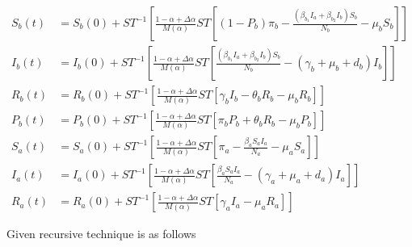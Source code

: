 \documentclass[10pt]{NSP1}
\begin{document}
\begin{equation}
\begin{aligned}
S_{b}(t) &= S_{b}(0) + {ST}^{- 1}\left\lbrack \frac{1 - \alpha + \Delta\alpha}{M(\alpha)}ST\left\lbrack \left( 1 - P_{b} \right)\pi_{b} - \frac{\left( \beta_{b_{1}}I_{a} + \beta_{b_{2}}I_{b} \right)S_{b}}{N_{b}} - \mu_{b}S_{b} \right\rbrack \right\rbrack \\
I_{b}(t) &= I_{b}(0) + {ST}^{- 1}\left\lbrack \frac{1 - \alpha + \Delta\alpha}{M(\alpha)}ST\left\lbrack \frac{\left( \beta_{b_{1}}I_{a} + \beta_{b_{2}}I_{b} \right)S_{b}}{N_{b}} - \left( \gamma_{b} + \mu_{b} + d_{b} \right)I_{b} \right\rbrack \right\rbrack \\
R_{b}(t) &= R_{b}(0) + {ST}^{- 1}\left\lbrack \frac{1 - \alpha + \Delta\alpha}{M(\alpha)}ST\left\lbrack \gamma_{b}I_{b} - \theta_{b}R_{b} - \mu_{b}R_{b} \right\rbrack \right\rbrack \\
P_{b}(t) &= P_{b}(0) + {ST}^{- 1}\left\lbrack \frac{1 - \alpha + \Delta\alpha}{M(\alpha)}ST\left\lbrack \pi_{b}P_{b} + \theta_{b}R_{b} - \mu_{b}P_{b} \right\rbrack \right\rbrack \\
S_{a}(t) &= S_{a}(0) + {ST}^{- 1}\left\lbrack \frac{1 - \alpha + \Delta\alpha}{M(\alpha)}ST\left\lbrack \pi_{a} - \frac{\beta_{a}S_{a}I_{a}}{N_{a}} - \mu_{a}S_{a} \right\rbrack \right\rbrack \\
I_{a}(t) &= I_{a}(0) + {ST}^{- 1}\left\lbrack \frac{1 - \alpha + \Delta\alpha}{M(\alpha)}ST\left\lbrack \frac{\beta_{a}S_{a}I_{a}}{N_{a}} - \left( \gamma_{a} + \mu_{a} + d_{a} \right)I_{a} \right\rbrack \right\rbrack \\
R_{a}(t) &= R_{a}(0) + {ST}^{- 1}\left\lbrack \frac{1 - \alpha + \Delta\alpha}{M(\alpha)}ST\left\lbrack \gamma_{a}I_{a} - \mu_{a}R_{a} \right\rbrack \right\rbrack
\end{aligned}
\end{equation}



Given recursive technique is as follows
\end{document}

